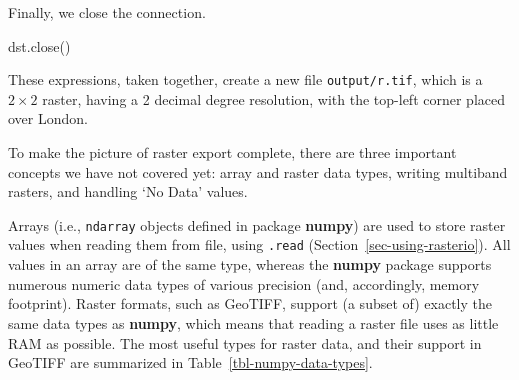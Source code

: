\documentclass[
  letterpaper,
]{krantz}
\newenvironment{Shaded}{\begin{snugshade}}{\end{snugshade}}
\newcommand{\NormalTok}[1]{\textcolor[rgb]{0.00,0.23,0.31}{#1}}
\begin{document}
Finally, we close the connection.

\begin{Shaded}
\begin{Highlighting}[]
\NormalTok{dst.close()}
\end{Highlighting}
\end{Shaded}

These expressions, taken together, create a new file
\texttt{output/r.tif}, which is a \(2 \times 2\) raster, having a 2
decimal degree resolution, with the top-left corner placed over London.

To make the picture of raster export complete, there are three important
concepts we have not covered yet: array and raster data types, writing
multiband rasters, and handling `No Data' values.

Arrays (i.e., \texttt{ndarray} objects defined in package
\textbf{numpy}) are used to store raster values when reading them from
file, using \texttt{.read} (Section~\ref{sec-using-rasterio}). All
values in an array are of the same type, whereas the \textbf{numpy}
package supports numerous numeric data types of various precision (and,
accordingly, memory footprint). Raster formats, such as GeoTIFF, support
(a subset of) exactly the same data types as \textbf{numpy}, which means
that reading a raster file uses as little RAM as possible. The most
useful types for raster data, and their support in GeoTIFF are
summarized in Table~\ref{tbl-numpy-data-types}.
\end{document}
